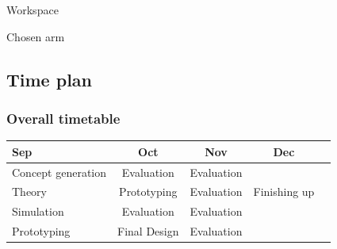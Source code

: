 \documentclass{beamer}
\begin{document}


\begin{frame}{Workspace}


\end{frame}




\begin{frame}{Chosen arm}


\end{frame}










\begin{frame}
    \subsection{Time plan}
    \frametitle{Overall timetable}
    \begin{table}
        \begin{tabular}{| l | c | c | c | c }
            
            Sep & Oct & Nov & Dec \\
            \hline \hline
            Concept generation & Evaluation & Evaluation &  \\ 
            \hline
            Theory & Prototyping & Evaluation & Finishing up \\
            \hline
            Simulation & Evaluation & Evaluation & \\
            \hline
            Prototyping & Final Design & Evaluation &  \\
            \hline
 
        \end{tabular}
    \end{table}    
\end{frame}
\end{document}
